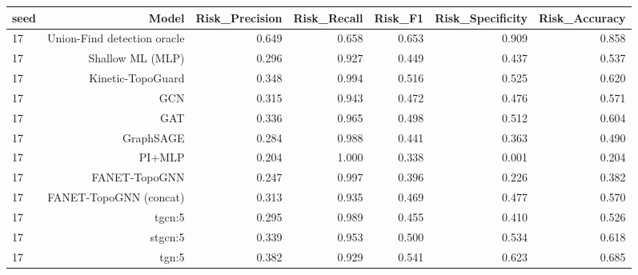 \begin{tabular}{lrrrrrr}
\toprule
seed & Model & Risk\_Precision & Risk\_Recall & Risk\_F1 & Risk\_Specificity & Risk\_Accuracy \\
\midrule
17 & Union-Find detection oracle & 0.649 & 0.658 & 0.653 & 0.909 & 0.858 \\
17 & Shallow ML (MLP) & 0.296 & 0.927 & 0.449 & 0.437 & 0.537 \\
17 & Kinetic-TopoGuard & 0.348 & 0.994 & 0.516 & 0.525 & 0.620 \\
17 & GCN & 0.315 & 0.943 & 0.472 & 0.476 & 0.571 \\
17 & GAT & 0.336 & 0.965 & 0.498 & 0.512 & 0.604 \\
17 & GraphSAGE & 0.284 & 0.988 & 0.441 & 0.363 & 0.490 \\
17 & PI+MLP & 0.204 & 1.000 & 0.338 & 0.001 & 0.204 \\
17 & FANET-TopoGNN & 0.247 & 0.997 & 0.396 & 0.226 & 0.382 \\
17 & FANET-TopoGNN (concat) & 0.313 & 0.935 & 0.469 & 0.477 & 0.570 \\
17 & tgcn:5 & 0.295 & 0.989 & 0.455 & 0.410 & 0.526 \\
17 & stgcn:5 & 0.339 & 0.953 & 0.500 & 0.534 & 0.618 \\
17 & tgn:5 & 0.382 & 0.929 & 0.541 & 0.623 & 0.685 \\
\bottomrule
\end{tabular}